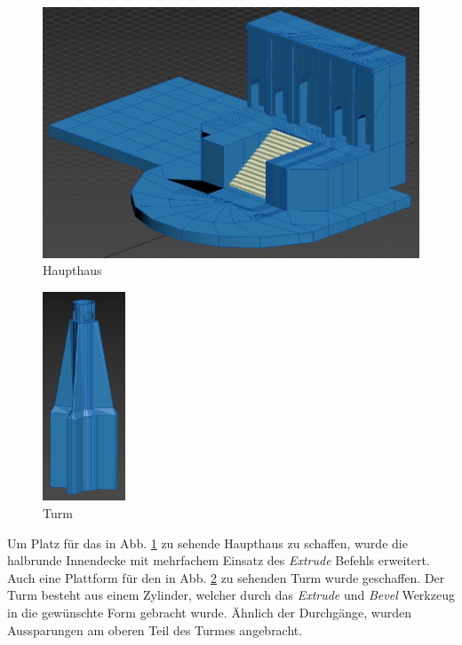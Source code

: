 \begin{figure}[h]
	\centering
	\includegraphics[width=0.95 \linewidth]{Abbildungen/3dsMax/Gebaeude}
	\caption{Haupthaus}
	\label{fig:Haupthaus}
\end{figure}

\begin{figure}
	\begin{center}
		\includegraphics[width=0.22\textwidth]{Abbildungen/3dsMax/Turm}
	\end{center}
	\caption{Turm}
	\label{fig:Turm}
\end{figure}

Um Platz für das in Abb. \ref{fig:Haupthaus} zu sehende Haupthaus zu schaffen, wurde die halbrunde Innendecke mit mehrfachem Einsatz des \textit{Extrude} Befehls erweitert. Auch eine Plattform für den in Abb. \ref{fig:Turm} zu sehenden Turm wurde geschaffen. Der Turm besteht aus einem Zylinder, welcher durch das \textit{Extrude} und \textit{Bevel} Werkzeug in die gewünschte Form gebracht wurde. Ähnlich der Durchgänge, wurden Aussparungen am oberen Teil des Turmes angebracht.
\newpage

